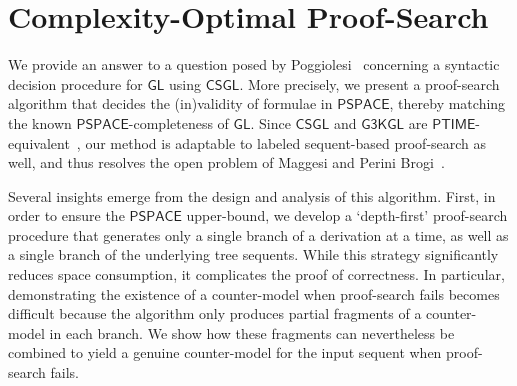 \documentclass[copyright,creativecommons]{eptcs}
\newcommand{\treegl}{\mathsf{CSGL}}
\newcommand{\logicgl}{\mathsf{GL}}
\newcommand{\calc}{\mathsf{CSGL}}
\newcommand{\pspace}{\mathsf{PSPACE}}
\newcommand{\ptime}{\mathsf{PTIME}}
\begin{document}
\section{Complexity-Optimal Proof-Search}\label{sec:proof-search}




We provide an answer to a question posed by Poggiolesi~\cite[p.~610]{Pog09b} concerning a syntactic decision procedure for $\logicgl$ using $\calc$. More
precisely, we present a proof-search algorithm that decides the
(in)validity of formulae in $\pspace$, thereby matching the known $\pspace$-completeness of $\logicgl$. Since $\treegl$ and
$\mathsf{G3KGL}$ are $\ptime$-equivalent~\cite{GorRam12,LyoOst24}, our
method is adaptable to labeled sequent-based proof-search as well, and thus resolves the open problem of Maggesi and Perini
Brogi~\cite[Section~7]{MagPer23}.




Several insights emerge from the design and analysis of this algorithm. First, in order to ensure the $\pspace$ upper-bound, we develop a `depth-first' proof-search procedure that generates only a single branch of a derivation at a time, as well as a single branch of the underlying tree sequents. While this strategy significantly reduces space consumption, it complicates the proof of correctness. In particular, demonstrating the existence of a counter-model when proof-search fails becomes difficult because the algorithm only produces partial fragments of a counter-model in each branch. We show how these fragments can nevertheless be combined to yield a genuine counter-model for the input sequent when proof-search fails.
\end{document}
